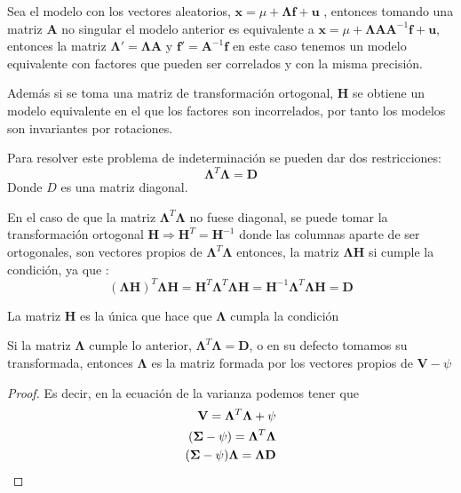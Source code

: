 \noindent Sea el modelo con los vectores aleatorios, $\textbf{x}=\mu+\mathbf{\Lambda} \textbf{f}+\textbf{u}$ , entonces tomando una matriz $\textbf{A}$ no singular el modelo anterior es equivalente a $\textbf{x}=\mu+\mathbf{\Lambda} \textbf{A}\textbf{A}^{-1} \textbf{f}+\textbf{u}$, entonces la matriz $\mathbf{\Lambda}'=\mathbf{\Lambda} \textbf{A}$ y $\textbf{f}'=\textbf{A}^{-1}\textbf{f}$ en este caso tenemos un modelo equivalente con factores que pueden ser correlados y con la misma precisión. 

\noindent Además si se toma una matriz de transformación ortogonal, \textbf{H} se obtiene un modelo equivalente en el que los factores son incorrelados, por tanto los modelos son invariantes por rotaciones. 

\noindent Para resolver este problema de indeterminación  se pueden dar dos restricciones:
\begin{equation}
\mathbf{\Lambda}^T\mathbf{\Lambda}=\textbf{D} 
\end{equation} 
\noindent Donde $D$ es una matriz diagonal. 

\noindent En el caso de que la matriz $\mathbf{\Lambda}^T\mathbf{\Lambda}$ no fuese diagonal, se puede tomar la transformación ortogonal $\textbf{H}\Rightarrow \textbf{H}^T=\textbf{H}^{-1}$ donde las columnas aparte de ser ortogonales, son vectores propios de $\mathbf{\Lambda}^T\mathbf{\Lambda}$ entonces, la matriz $\mathbf{\Lambda}\textbf{H}$ si cumple la condición, ya que :
\begin{equation}
(\mathbf{\Lambda}\textbf{H})^T\mathbf{\Lambda}\textbf{H}=\textbf{H}^T\mathbf{\Lambda}^T \mathbf{\Lambda}\textbf{H}=\textbf{H}^{-1}\mathbf{\Lambda}^T \mathbf{\Lambda}\textbf{H}=\textbf{D}
\end{equation}

\begin{coro}
La matriz $\textbf{H}$ es la única que hace que $\mathbf{\Lambda}$ cumpla la condición 
\end{coro}

\begin{propo}
Si la matriz $\mathbf{\Lambda}$ cumple lo anterior, $\mathbf{\Lambda}^T \mathbf{\Lambda}=\textbf{D}$, o en su defecto tomamos su transformada, entonces $\mathbf{\Lambda}$ es la matriz formada por los vectores propios de $\textbf{V}-\psi$
\begin{proof}
Es decir, en la ecuación de la varianza podemos tener que 
\begin{equation}
\begin{split}
\textbf{V}=\mathbf{\Lambda}^T\mathbf{\Lambda}+\psi\\
(\mathbf{\Sigma}-\psi)=\mathbf{\Lambda}^T\mathbf{\Lambda}\\
(\mathbf{\Sigma}-\psi)\mathbf{\Lambda}=\mathbf{\Lambda}\textbf{D}\qedhere
\end{split}
\end{equation}
\end{proof}
\end{propo}

